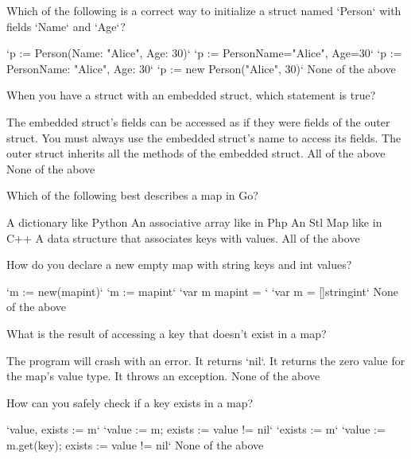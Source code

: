 \documentclass[12pt]{exam}
\begin{document}
\begin{questions}
\question[2]  Which of the following is a correct way to initialize a struct named `Person` with fields `Name` and `Age`?
\begin{choices}
\choice  `p := Person(Name: "Alice", Age: 30)`
\choice  `p := Person{Name="Alice", Age=30}`
\CorrectChoice  `p := Person{Name: "Alice", Age: 30}`
\choice  `p := new Person("Alice", 30)`
\choice  None of the above
\end{choices}
 
\question[2]  When you have a struct with an embedded struct, which statement is true?
\begin{choices}
\CorrectChoice  The embedded struct's fields can be accessed as if they were fields of the outer struct.
\choice  You must always use the embedded struct's name to access its fields.
\choice  The outer struct inherits all the methods of the embedded struct.
\choice  All of the above
\choice  None of the above
\end{choices}
 
\question[2]  Which of the following best describes a map in Go?
\begin{choices}
\choice  A dictionary like Python
\choice  An associative array like in Php
\CorrectChoice  An Stl Map like in C++
\choice  A data structure that associates keys with values.
\choice  All of the above
\end{choices}
 
\question[2]  How do you declare a new empty map with string keys and int values?
\begin{choices}
\choice  `m := new(mapint)`
\CorrectChoice  `m := mapint{}`
\choice  `var m mapint = {}`
\choice  `var m = []string{int}`
\choice  None of the above
\end{choices}
 
\question[2]  What is the result of accessing a key that doesn't exist in a map?
\begin{choices}
\choice  The program will crash with an error.
\choice  It returns `nil`.
\CorrectChoice  It returns the zero value for the map's value type.
\choice  It throws an exception.
\choice  None of the above
\end{choices}
 
\question[2]  How can you safely check if a key exists in a map?
\begin{choices}
\CorrectChoice  `value, exists := m`
\choice  `value := m; exists := value != nil`
\choice  `exists := m`
\choice  `value := m.get(key); exists := value != nil`
\choice  None of the above
\end{choices}
 

\end{questions}
\end{document}
